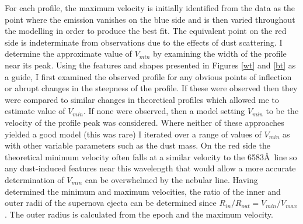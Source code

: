 For each profile, the maximum velocity is initially identified from the 
data as the point where the emission vanishes on the blue side and is then 
varied throughout the modelling in order to produce the best fit.  The 
equivalent point on the red side is indeterminate from observations due to 
the effects of dust scattering.  I determine the approximate value of 
$V_{min}$ by examining the width of the profile near its peak. Using the features and shapes presented in Figures \ref{wt} and \ref{bt} as a guide, I first examined the observed profile for any obvious points of inflection or abrupt changes in the steepness of the profile.  If these were observed then they were compared to similar changes in theoretical profiles which allowed me to estimate value of $V_{min}$.  If none were observed, then a model setting $V_{min}$ to be the velocity of the profile peak was considered.  Where neither of these approaches yielded a good model (this was rare) I iterated over a range of values of $V_{min}$ as with other variable parameters such as the dust mass.  On the red side the theoretical minimum velocity often 
falls at a similar velocity to the 6583\AA\ line so any dust-induced 
features near this wavelength that would allow a more accurate 
determination of $V_{min}$ can be overwhelmed by the nebular line.  
Having determined the minimum and maximum velocities, the ratio of the 
inner and outer radii of the supernova ejecta can be determined since 
$R_{in}/R_{out}=V_{min}/V_{max}$.  The outer radius is calculated from the 
epoch and the maximum velocity.

